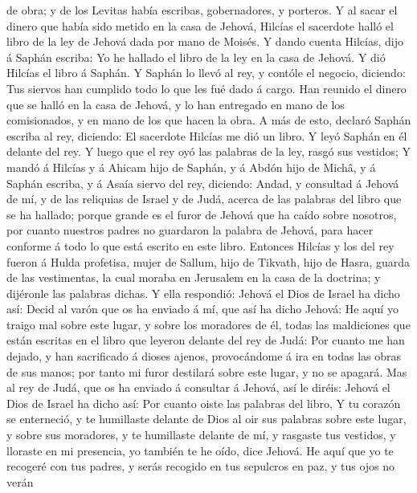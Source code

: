 de obra; y de los Levitas había escribas, gobernadores, y porteros.
 Y al sacar el dinero que había sido metido en la casa de
Jehová, Hilcías el sacerdote halló el libro de la ley de Jehová dada por
mano de Moisés.  Y dando cuenta Hilcías, dijo á Saphán
escriba: Yo he hallado el libro de la ley en la casa de Jehová. Y dió
Hilcías el libro á Saphán.  Y Saphán lo llevó al rey, y
contóle el negocio, diciendo: Tus siervos han cumplido todo lo que les
fué dado á cargo.  Han reunido el dinero que se halló en
la casa de Jehová, y lo han entregado en mano de los comisionados, y en
mano de los que hacen la obra.  A más de esto, declaró
Saphán escriba al rey, diciendo: El sacerdote Hilcías me dió un libro. Y
leyó Saphán en él delante del rey.  Y luego que el rey
oyó las palabras de la ley, rasgó sus vestidos;  Y mandó
á Hilcías y á Ahicam hijo de Saphán, y á Abdón hijo de Michâ, y á Saphán
escriba, y á Asaía siervo del rey, diciendo:  Andad, y
consultad á Jehová de mí, y de las reliquias de Israel y de Judá, acerca
de las palabras del libro que se ha hallado; porque grande es el furor
de Jehová que ha caído sobre nosotros, por cuanto nuestros padres no
guardaron la palabra de Jehová, para hacer conforme á todo lo que está
escrito en este libro.  Entonces Hilcías y los del rey
fueron á Hulda profetisa, mujer de Sallum, hijo de Tikvath, hijo de
Hasra, guarda de las vestimentas, la cual moraba en Jerusalem en la casa
de la doctrina; y dijéronle las palabras dichas.  Y ella
respondió: Jehová el Dios de Israel ha dicho así: Decid al varón que os
ha enviado á mí, que así ha dicho Jehová:  He aquí yo
traigo mal sobre este lugar, y sobre los moradores de él, todas las
maldiciones que están escritas en el libro que leyeron delante del rey
de Judá:  Por cuanto me han dejado, y han sacrificado á
dioses ajenos, provocándome á ira en todas las obras de sus manos; por
tanto mi furor destilará sobre este lugar, y no se apagará.
 Mas al rey de Judá, que os ha enviado á consultar á
Jehová, así le diréis: Jehová el Dios de Israel ha dicho así: Por cuanto
oiste las palabras del libro,  Y tu corazón se
enterneció, y te humillaste delante de Dios al oir sus palabras sobre
este lugar, y sobre sus moradores, y te humillaste delante de mí, y
rasgaste tus vestidos, y lloraste en mi presencia, yo también te he
oído, dice Jehová.  He aquí que yo te recogeré con tus
padres, y serás recogido en tus sepulcros en paz, y tus ojos no verán
